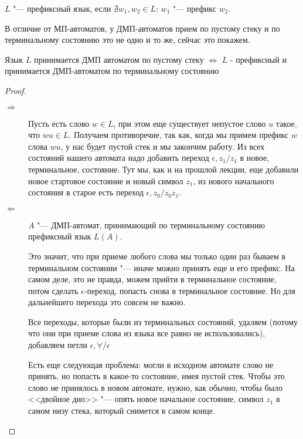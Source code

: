 \begin{Def}
    $L$ "--- префиксный язык, если $\nexists w_1, w_2 \in L$: $w_1$ "--- префикс $w_2$.
\end{Def}

В отличие от МП-автоматов, у ДМП-автоматов прием по пустому стеку и по терминальному состоянию это не одно и то же, сейчас это покажем.

\begin{theorem}
Язык $L$ принимается ДМП автоматом по пустому стеку $\Leftrightarrow$ $L$ - префиксный и принимается ДМП-автоматом по терминальному состоянию
\end{theorem}
\begin{proof}
\begin{description}
    \item[$\Rightarrow$]

Пусть есть слово $w \in L$, при этом еще существует непустое слово $u$ такое, что $wu \in L$.
Получаем противоречие, так как, когда мы примем префикс $w$ слова $wu$, у нас будет пустой стек и мы закончим работу.
Из всех состояний нашего автомата надо добавить переход $\epsilon, z_1/z_1$ в новое, терминальное, состояние. 
Тут мы, как и на прошлой лекции, еще добавили новое стартовое состояние и новый символ $z_1$, из нового начального состояния в старое есть переход $\epsilon, z_0/z_0z_1$.

\item[$\Leftarrow$]
$A$ "--- ДМП-автомат, принимающий по терминальному состоянию префиксный язык $L(A)$.

Это значит, что при приеме любого слова мы только один раз бываем в терминальном состоянии "--- иначе можно принять еще и его префикс.
На самом деле, это не правда, можем прийти в терминальное состояние, потом сделать $\epsilon$-переход, попасть снова в терминальное состояние. 
Но для дальнейшего перехода это совсем не важно.

Все переходы, которые были из терминальных состояний, удаляем (потому что они при приеме слова из языка все равно не использовались), добавляем петли $\epsilon, \forall/\epsilon$

Есть еще следующая проблема: могли в исходном автомате слово не принять, но попасть в какое-то состояние, имея пустой стек. 
Чтобы это слово не принялось в новом автомате, нужно, как обычно, чтобы было <<двойное дно>> "--- опять новое начальное состояние, символ $z_1$ в самом низу стека, который снимется в самом конце.
\end{description}
\end{proof}

